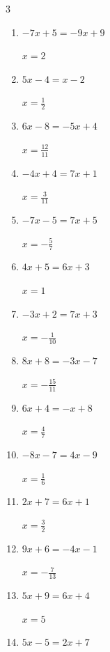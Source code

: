 \begin{multicols}{3}
\begin{enumerate}
        $\displaystyle x=\frac{7}{11}$

  \item $-7x+5=-9x+9$

        $\displaystyle x=2$

  \item $5x-4=x-2$

        $\displaystyle x=\frac{1}{2}$

\columnbreak %

\resetques

  \item $6x-8=-5x+4$

        $\displaystyle x=\frac{12}{11}$

  \item $-4x+4=7x+1$

        $\displaystyle x=\frac{3}{11}$

  \item $-7x-5=7x+5$

        $\displaystyle x=-\frac{5}{7}$

  \item $4x+5=6x+3$

        $\displaystyle x=1$

  \item $-3x+2=7x+3$

        $\displaystyle x=-\frac{1}{10}$

  \item $8x+8=-3x-7$

        $\displaystyle x=-\frac{15}{11}$

  \item $6x+4=-x+8$

        $\displaystyle x=\frac{4}{7}$

  \item $-8x-7=4x-9$

        $\displaystyle x=\frac{1}{6}$

  \item $2x+7=6x+1$

        $\displaystyle x=\frac{3}{2}$

  \item $9x+6=-4x-1$

        $\displaystyle x=-\frac{7}{13}$

  \item $5x+9=6x+4$

        $\displaystyle x=5$

  \item $5x-5=2x+7$


\end{enumerate}
\end{multicols}
